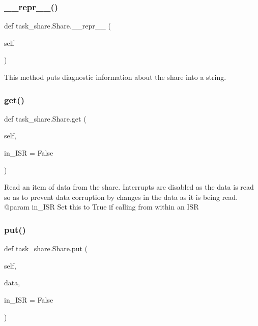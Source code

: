 \subsubsection{\texorpdfstring{\+\_\+\+\_\+repr\+\_\+\+\_\+()}{\_\_repr\_\_()}}
{\footnotesize\ttfamily def task\+\_\+share.\+Share.\+\_\+\+\_\+repr\+\_\+\+\_\+ (\begin{DoxyParamCaption}\item[{}]{self }\end{DoxyParamCaption})}

\begin{DoxyVerb}This method puts diagnostic information about the share into a 
string. \end{DoxyVerb}
 \mbox{\label{classtask__share_1_1Share_a599cd89ed1cd79af8795a51d8de70d27}} 
\subsubsection{\texorpdfstring{get()}{get()}}
{\footnotesize\ttfamily def task\+\_\+share.\+Share.\+get (\begin{DoxyParamCaption}\item[{}]{self,  }\item[{}]{in\+\_\+\+I\+SR = {\ttfamily False} }\end{DoxyParamCaption})}

\begin{DoxyVerb}Read an item of data from the share. Interrupts are disabled as
the data is read so as to prevent data corruption by changes in
the data as it is being read. 
@param in_ISR Set this to True if calling from within an ISR \end{DoxyVerb}
 \mbox{\label{classtask__share_1_1Share_ab449c261f259db176ffeea55ccbf5d96}} 
\subsubsection{\texorpdfstring{put()}{put()}}
{\footnotesize\ttfamily def task\+\_\+share.\+Share.\+put (\begin{DoxyParamCaption}\item[{}]{self,  }\item[{}]{data,  }\item[{}]{in\+\_\+\+I\+SR = {\ttfamily False} }\end{DoxyParamCaption})}

